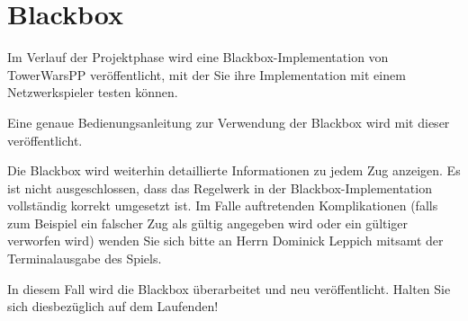\section*{Blackbox}
Im Verlauf der Projektphase wird eine Blackbox-Implementation von TowerWarsPP veröffentlicht, mit der Sie ihre Implementation mit einem Netzwerkspieler testen können.

Eine genaue Bedienungsanleitung zur Verwendung der Blackbox wird mit dieser veröffentlicht.

Die Blackbox wird weiterhin detaillierte Informationen zu jedem Zug anzeigen. Es ist nicht ausgeschlossen, dass das Regelwerk in der Blackbox-Implementation vollständig korrekt umgesetzt ist. Im Falle auftretenden Komplikationen (falls zum Beispiel ein falscher Zug als gültig angegeben wird oder ein gültiger verworfen wird) wenden Sie sich bitte an Herrn Dominick Leppich mitsamt der Terminalausgabe des Spiels.

In diesem Fall wird die Blackbox überarbeitet und neu veröffentlicht. Halten Sie sich diesbezüglich auf dem Laufenden!